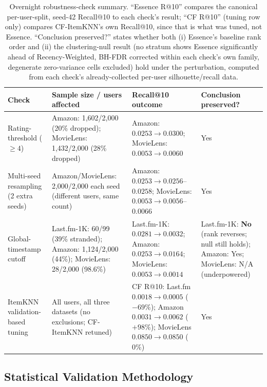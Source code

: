 \documentclass[11pt,a4paper]{article}
\begin{document}
\begin{table}[H]
\centering
\caption{Overnight robustness-check summary. ``Essence R@10'' compares
         the canonical per-user-split, seed-42 Recall@10 to each
         check's result; ``CF R@10'' (tuning row only) compares
         CF-ItemKNN's own Recall@10, since that is what was tuned, not
         Essence. ``Conclusion preserved?'' states whether both (i)
         Essence's baseline rank order and (ii) the clustering-null
         result (no stratum shows Essence significantly ahead of
         Recency-Weighted, BH-FDR corrected within each check's own
         family, degenerate zero-variance cells excluded) hold under
         the perturbation, computed from each check's already-collected
         per-user silhouette/recall data.}
\label{tab:robustness}
\small
\begin{tabular}{p{2.9cm}p{3.7cm}p{3.9cm}p{3.5cm}}
\toprule
\textbf{Check} & \textbf{Sample size / users affected} & \textbf{Recall@10 outcome} & \textbf{Conclusion preserved?} \\
\midrule
Rating-threshold ($\geq 4$)
  & Amazon: 1{,}602/2{,}000 (20\% dropped); MovieLens: 1{,}432/2{,}000 (28\% dropped)
  & Amazon: $0.0253\to0.0300$; MovieLens: $0.0053\to0.0060$
  & Yes \\
\midrule
Multi-seed resampling (2 extra seeds)
  & Amazon/MovieLens: 2{,}000/2{,}000 each seed (different users, same count)
  & Amazon: $0.0253\to0.0256$--$0.0258$; MovieLens: $0.0053\to0.0056$--$0.0066$
  & Yes \\
\midrule
Global-timestamp cutoff
  & Last.fm-1K: 60/99 (39\% stranded); Amazon: 1{,}124/2{,}000 (44\%); MovieLens: 28/2{,}000 (98.6\%)
  & Last.fm-1K: $0.0281\to0.0032$; Amazon: $0.0253\to0.0164$; MovieLens: $0.0053\to0.0014$
  & Last.fm-1K: \textbf{No} (rank reverses; null still holds); Amazon: Yes; MovieLens: N/A (underpowered) \\
\midrule
ItemKNN validation-based tuning
  & All users, all three datasets (no exclusions; CF-ItemKNN retuned)
  & CF R@10: Last.fm $0.0018\to0.0005$ ($-69\%$); Amazon $0.0031\to0.0062$ ($+98\%$); MovieLens $0.0850\to0.0850$ ($0\%$)
  & Yes \\
\bottomrule
\end{tabular}
\end{table}

\subsection{Statistical Validation Methodology}
\label{sec:stats-methodology}
\end{document}
